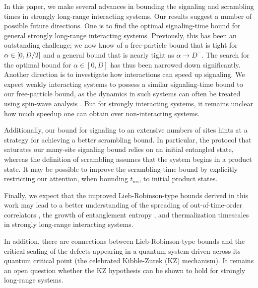 In this paper, we make several advances in bounding the signaling and scrambling times in strongly long-range interacting systems.
Our results suggest a number of possible future directions.
One is to find the optimal signaling-time bound for general strongly long-range interacting systems.
Previously, this has been an outstanding challenge; we now know of a free-particle bound that is tight for $\alpha \in [0,D/2]$ and a general bound that is nearly tight as $\alpha\rightarrow D^-$.
The search for the optimal bound for $\alpha\in [0,D]$ has thus been narrowed down significantly.
Another direction is to investigate how interactions can speed up signaling.
We expect weakly interacting systems to possess a similar signaling-time bound to our free-particle bound, as the dynamics in such systems can often be treated using spin-wave analysis \cite{Cevolani18}.
But for strongly interacting systems, it remains unclear how much speedup one can obtain over non-interacting systems.

Additionally, our bound for signaling to an extensive numbers of sites hints at a strategy for achieving a better scrambling bound.
In particular, the protocol that saturates our many-site signaling bound relies on an initial entangled state, whereas the definition of scrambling assumes that the system begins in a product state.
It may be possible to improve the scrambling-time bound by explicitly restricting our attention, when bounding $t_\text{ms}$, to initial product states.

Finally, we expect that the improved Lieb-Robinson-type bounds derived in this work may lead to a better understanding of the spreading of out-of-time-order correlators \cite{Luitz19}, the growth of entanglement entropy \cite{Gong17}, and thermalization timescales \cite{Nandkishore15} in strongly long-range interacting systems.

In addition, there are connections between Lieb-Robinson-type bounds and the critical scaling of the defects appearing in a quantum system driven across its quantum critical point (the celebrated Kibble-Zurek (KZ) mechanism).
It remains an open question whether the KZ hypothesis can be shown to hold for strongly long-range systems.
